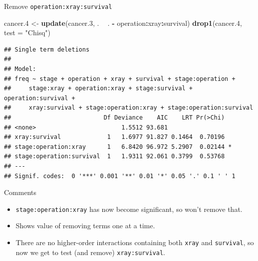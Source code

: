 \documentclass[ignorenonframetext,]{beamer}
\newenvironment{Shaded}{\begin{snugshade}}{\end{snugshade}}
\newcommand{\DataTypeTok}[1]{\textcolor[rgb]{0.13,0.29,0.53}{#1}}
\newcommand{\FloatTok}[1]{\textcolor[rgb]{0.00,0.00,0.81}{#1}}
\newcommand{\KeywordTok}[1]{\textcolor[rgb]{0.13,0.29,0.53}{\textbf{#1}}}
\newcommand{\NormalTok}[1]{#1}
\newcommand{\OperatorTok}[1]{\textcolor[rgb]{0.81,0.36,0.00}{\textbf{#1}}}
\newcommand{\StringTok}[1]{\textcolor[rgb]{0.31,0.60,0.02}{#1}}
\begin{document}
\begin{frame}[fragile]{Remove \texttt{operation:xray:survival}}
\protect\hypertarget{remove-operationxraysurvival}{}

\scriptsize

\begin{Shaded}
\begin{Highlighting}[]
\NormalTok{cancer}\FloatTok{.4}\NormalTok{ <-}\StringTok{ }\KeywordTok{update}\NormalTok{(cancer}\FloatTok{.3}\NormalTok{, . }\OperatorTok{~}\StringTok{ }\NormalTok{. }\OperatorTok{-}\StringTok{ }\NormalTok{operation}\OperatorTok{:}\NormalTok{xray}\OperatorTok{:}\NormalTok{survival)}
\KeywordTok{drop1}\NormalTok{(cancer}\FloatTok{.4}\NormalTok{, }\DataTypeTok{test =} \StringTok{"Chisq"}\NormalTok{)}
\end{Highlighting}
\end{Shaded}

\begin{verbatim}
## Single term deletions
## 
## Model:
## freq ~ stage + operation + xray + survival + stage:operation + 
##     stage:xray + operation:xray + stage:survival + operation:survival + 
##     xray:survival + stage:operation:xray + stage:operation:survival
##                          Df Deviance    AIC    LRT Pr(>Chi)  
## <none>                        1.5512 93.681                  
## xray:survival             1   1.6977 91.827 0.1464  0.70196  
## stage:operation:xray      1   6.8420 96.972 5.2907  0.02144 *
## stage:operation:survival  1   1.9311 92.061 0.3799  0.53768  
## ---
## Signif. codes:  0 '***' 0.001 '**' 0.01 '*' 0.05 '.' 0.1 ' ' 1
\end{verbatim}

\normalsize

\end{frame}

\begin{frame}[fragile]{Comments}
\protect\hypertarget{comments-51}{}

\begin{itemize}
\item
  \texttt{stage:operation:xray} has now become significant, so won't
  remove that.
\item
  Shows value of removing terms one at a time.
\item
  There are no higher-order interactions containing both \texttt{xray}
  and \texttt{survival}, so now we get to test (and remove)
  \texttt{xray:survival}.
\end{itemize}

\end{frame}
\end{document}
